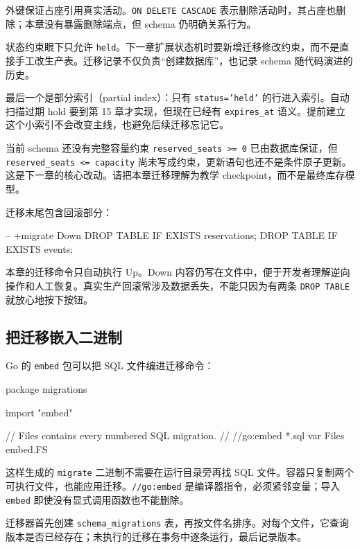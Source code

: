 外键保证占座引用真实活动。\texttt{ON DELETE CASCADE} 表示删除活动时，其占座也删除；本章没有暴露删除端点，但 schema 仍明确关系行为。

状态约束眼下只允许 \texttt{held}。下一章扩展状态机时要新增迁移修改约束，而不是直接手工改生产表。迁移记录不仅负责“创建数据库”，也记录 schema 随代码演进的历史。

最后一个是部分索引（partial index）：只有 \texttt{status='held'} 的行进入索引。自动扫描过期 hold 要到第 15 章才实现，但现在已经有 \texttt{expires\_at} 语义。提前建立这个小索引不会改变主线，也避免后续迁移忘记它。

\begin{warningbox}{当前 schema 还没有完整容量约束}
\texttt{reserved\_seats >= 0} 已由数据库保证，但 \texttt{reserved\_seats <= capacity} 尚未写成约束，更新语句也还不是条件原子更新。这是下一章的核心改动。请把本章迁移理解为教学 checkpoint，而不是最终库存模型。
\end{warningbox}

迁移末尾包含回滚部分：

\begin{sqlcode}[]
-- +migrate Down
DROP TABLE IF EXISTS reservations;
DROP TABLE IF EXISTS events;
\end{sqlcode}

本章的迁移命令只自动执行 Up。Down 内容仍写在文件中，便于开发者理解逆向操作和人工恢复。真实生产回滚常涉及数据丢失，不能只因为有两条 \texttt{DROP TABLE} 就放心地按下按钮。

\subsection{把迁移嵌入二进制}

Go 的 \texttt{embed} 包可以把 SQL 文件编进迁移命令：

\begin{gocode}[title={代码清单 12.38 \texttt{migrations/embed.go}：嵌入 SQL}]
package migrations

import "embed"

// Files contains every numbered SQL migration.
//
//go:embed *.sql
var Files embed.FS
\end{gocode}

这样生成的 \texttt{migrate} 二进制不需要在运行目录旁再找 SQL 文件。容器只复制两个可执行文件，也能应用迁移。\texttt{//go:embed} 是编译器指令，必须紧邻变量；导入 \texttt{embed} 即使没有显式调用函数也不能删除。

迁移器首先创建 \texttt{schema\_migrations} 表，再按文件名排序。对每个文件，它查询版本是否已经存在；未执行的迁移在事务中逐条运行，最后记录版本。

